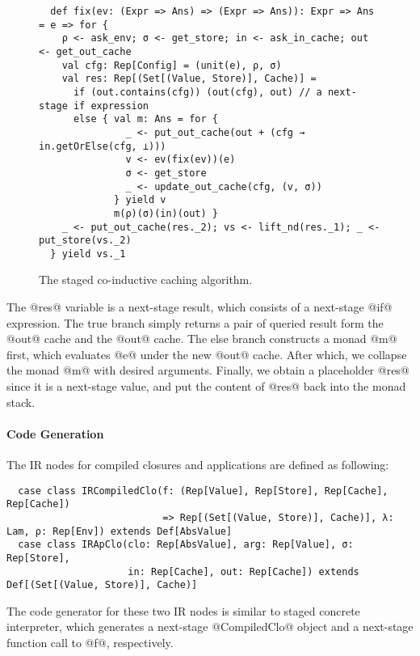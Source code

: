 \vspace{-1em}
\begin{figure}[h!]
  \centering
\begin{lstlisting}
  def fix(ev: (Expr => Ans) => (Expr => Ans)): Expr => Ans = e => for {
    ρ <- ask_env; σ <- get_store; in <- ask_in_cache; out <- get_out_cache
    val cfg: Rep[Config] = (unit(e), ρ, σ)
    val res: Rep[(Set[(Value, Store)], Cache)] =
      if (out.contains(cfg)) (out(cfg), out) // a next-stage if expression
      else { val m: Ans = for {
               _ <- put_out_cache(out + (cfg → in.getOrElse(cfg, ⊥)))
               v <- ev(fix(ev))(e)
               σ <- get_store
               _ <- update_out_cache(cfg, (v, σ))
             } yield v
             m(ρ)(σ)(in)(out) }
    _ <- put_out_cache(res._2); vs <- lift_nd(res._1); _ <- put_store(vs._2)
  } yield vs._1
\end{lstlisting}
\vspace{-1em}
\caption{The staged co-inductive caching algorithm.}
\label{fig:staged_coind_cache}
\end{figure}
\vspace{-1em}

The @res@ variable is a next-stage result, which consists of a next-stage @if@
expression. The true branch simply returns a pair of queried result form the
@out@ cache and the @out@ cache. The else branch constructs a monad @m@ first,
which evaluates @e@ under the new @out@ cache. After which, we collapse the
monad @m@ with desired arguments. Finally, we obtain a placeholder @res@ since
it is a next-stage value, and put the content of @res@ back into the monad
stack.

\paragraph{Code Generation} The IR nodes for compiled closures and
applications are defined as following:

\begin{lstlisting}
  case class IRCompiledClo(f: (Rep[Value], Rep[Store], Rep[Cache], Rep[Cache])
                           => Rep[(Set[(Value, Store)], Cache)], λ: Lam, ρ: Rep[Env]) extends Def[AbsValue]
  case class IRApClo(clo: Rep[AbsValue], arg: Rep[Value], σ: Rep[Store],
                     in: Rep[Cache], out: Rep[Cache]) extends Def[(Set[(Value, Store)], Cache)]
\end{lstlisting}

The code generator for these two IR nodes is similar to staged concrete
interpreter, which generates a next-stage @CompiledClo@ object and a next-stage
function call to @f@, respectively.
                   
